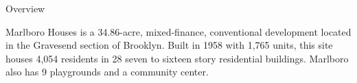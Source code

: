 Overview

Marlboro Houses is a 34.86-acre, mixed-finance, conventional development located in the Gravesend section of Brooklyn. Built in 1958 with 1,765 units, this site houses 4,054 residents in 28 seven to sixteen story residential buildings. Marlboro also has 9 playgrounds and a community center.